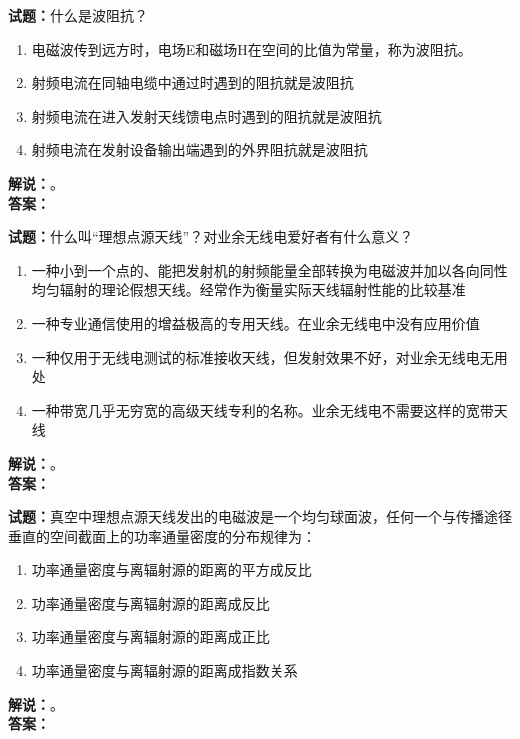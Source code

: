 \documentclass{ctexbook}
\begin{document}
\bigskip




\noindent\textbf{试题：}什么是波阻抗？
\begin{enumerate}[leftmargin=3em]
\item 电磁波传到远方时，电场E和磁场H在空间的比值为常量，称为波阻抗。
\item 射频电流在同轴电缆中通过时遇到的阻抗就是波阻抗
\item 射频电流在进入发射天线馈电点时遇到的阻抗就是波阻抗
\item 射频电流在发射设备输出端遇到的外界阻抗就是波阻抗
\end{enumerate}
\noindent\textbf{解说：}\textbf{}。\\\noindent\textbf{答案：}

\bigskip




\noindent\textbf{试题：}什么叫“理想点源天线”？对业余无线电爱好者有什么意义？	
\begin{enumerate}[leftmargin=3em]
\item 一种小到一个点的、能把发射机的射频能量全部转换为电磁波并加以各向同性均匀辐射的理论假想天线。经常作为衡量实际天线辐射性能的比较基准
\item 一种专业通信使用的增益极高的专用天线。在业余无线电中没有应用价值
\item 一种仅用于无线电测试的标准接收天线，但发射效果不好，对业余无线电无用处
\item 一种带宽几乎无穷宽的高级天线专利的名称。业余无线电不需要这样的宽带天线
\end{enumerate}
\noindent\textbf{解说：}\textbf{}。\\\noindent\textbf{答案：}

\bigskip




\noindent\textbf{试题：}真空中理想点源天线发出的电磁波是一个均匀球面波，任何一个与传播途径垂直的空间截面上的功率通量密度的分布规律为：
\begin{enumerate}[leftmargin=3em]
\item 功率通量密度与离辐射源的距离的平方成反比
\item 功率通量密度与离辐射源的距离成反比
\item 功率通量密度与离辐射源的距离成正比
\item 功率通量密度与离辐射源的距离成指数关系
\end{enumerate}
\noindent\textbf{解说：}\textbf{}。\\\noindent\textbf{答案：}
\end{document}
